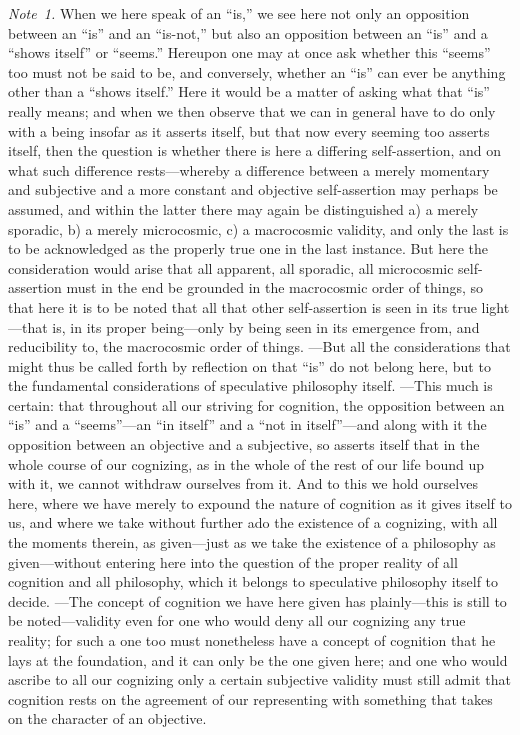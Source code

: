 \documentclass[12pt,a4paper]{book}
\begin{document}
{\small\emph{Note~1.} When we here speak of an ``is,'' we see here not only an
opposition between an ``is'' and an ``is-not,'' but also an opposition between an
``is'' and a ``shows itself'' or ``seems.'' Hereupon one may at once ask whether
this ``seems'' too must not be said to be, and conversely, whether an ``is'' can
ever be anything other than a ``shows itself.'' Here it would be a matter of
asking what that ``is'' really means; and when we then observe that we can in
general have to do only with a being insofar as it asserts itself, but that now
every seeming too asserts itself, then the question is whether there is here a
differing self-assertion, and on what such difference rests---whereby a difference
between a merely momentary and subjective and a more constant and objective
self-assertion may perhaps be assumed, and within the latter there may again be
distinguished a) a merely sporadic, b) a merely microcosmic, c) a macrocosmic
validity, and only the last is to be acknowledged as the properly true one in the
last instance. But here the consideration would arise that all apparent, all
sporadic, all microcosmic self-assertion must in the end be grounded in the
macrocosmic order of things, so that here it is to be noted that all that other
self-assertion is seen in its true light---that is, in its proper being---only by
being seen in its emergence from, and reducibility to, the macrocosmic order of
things. ---But all the considerations that might thus be called forth by
reflection on that ``is'' do not belong here, but to the fundamental
considerations of speculative philosophy itself. ---This much is certain: that
throughout all our striving for cognition, the opposition between an ``is'' and a
``seems''---an ``in itself'' and a ``not in itself''---and along with it the
opposition between an objective and a subjective, so asserts itself that in the
whole course of our cognizing, as in the whole of the rest of our life bound up
with it, we cannot withdraw ourselves from it. And to this we hold ourselves
here, where we have merely to expound the nature of cognition as it gives itself
to us, and where we take without further ado the existence of a cognizing, with
all the moments therein, as given---just as we take the existence of a philosophy
as given---without entering here into the question of the proper reality of all
cognition and all philosophy, which it belongs to speculative philosophy itself
to decide. ---The concept of cognition we have here given has plainly---this is
still to be noted---validity even for one who would deny all our cognizing any
true reality; for such a one too must nonetheless have a concept of cognition that
he lays at the foundation, and it can only be the one given here; and one who
would ascribe to all our cognizing only a certain subjective validity must still
admit that cognition rests on the agreement of our representing with something
that takes on the character of an objective.\par}
\end{document}
